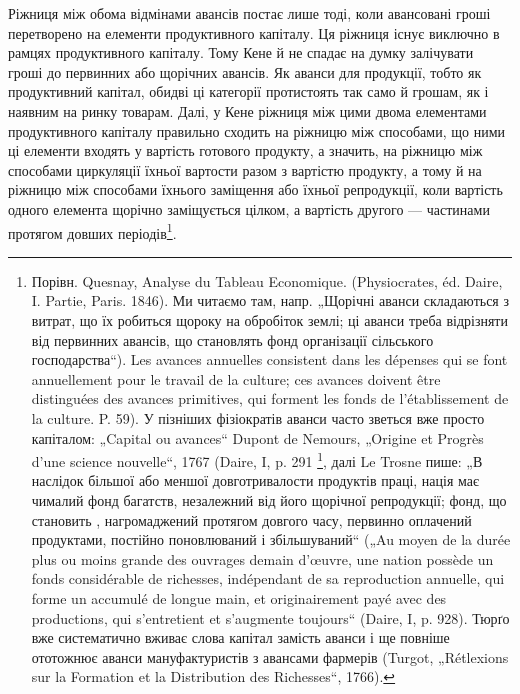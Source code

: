 Ріжниця між обома відмінами авансів постає лише тоді, коли авансовані
гроші перетворено на елементи продуктивного капіталу. Ця ріжниця
існує виключно в рамцях продуктивного капіталу. Тому Кене й не спадає
на думку залічувати гроші до первинних або щорічних авансів. Як аванси
для продукції, тобто як продуктивний капітал, обидві ці категорії протистоять
так само й грошам, як і наявним на ринку товарам. Далі, у Кене
ріжниця між цими двома елементами продуктивного капіталу правильно
сходить на ріжницю між способами, що ними ці елементи входять у вартість
готового продукту, а значить, на ріжницю між способами циркуляції
їхньої вартости разом з вартістю продукту, а тому й на ріжницю
між способами їхнього заміщення або їхньої репродукції, коли вартість
одного елемента щорічно заміщується цілком, а вартість другого — частинами
протягом довших періодів\footnote{
Порівн. Quesnay, Analyse du Tableau Economique. (Physiocrates, éd. Daire,
I. Partie, Paris. 1846). Ми читаємо там, напр. „Щорічні аванси складаються з витрат,
що їх робиться щороку на обробіток землі; ці аванси треба відрізняти від первинних
авансів, що становлять фонд організації сільського господарства“). Les
avances annuelles consistent dans les dépenses qui se font annuellement pour le
travail de la culture; ces avances doivent être distinguées des avances primitives,
qui forment les fonds de l’établissement de la culture. P. 59). У пізніших фізіократів
аванси часто зветься вже просто капіталом: „Capital ou avances“ Dupont de
Nemours, „Origine et Progrès d’une science nouvelle“, 1767 (Daire, I, p. 291 \footnote*{
Цитоване місце є не в статті „Origine et Progrès“, 1767 (Daire, I, p. 291),
a в статті „Maximes du docteur Quesnay“ (Daire, I, p. 391). \emph{Ред.}
},
далі Le Trosne пише: „В наслідок більшої або меншої довготривалости продуктів
праці, нація має чималий фонд багатств, незалежний від його щорічної
репродукції; фонд, що становить , нагромаджений протягом довгого
часу, первинно оплачений продуктами, постійно поновлюваний і збільшуваний“
(„Au moyen de la durée plus ou moins grande des ouvrages demain d'œuvre, une
nation possède un fonds considérable de richesses, indépendant de sa reproduction
annuelle, qui forme un  accumulé de longue main, et originairement payé
avec des productions, qui s'entretient et s’augmente toujours“ (Daire, I, p. 928).
Тюрґо вже систематично вживає слова капітал замість аванси і ще повніше ототожнює
аванси мануфактуристів з авансами фармерів (Turgot, „Rétlexions sur la
Formation et la Distribution des Richesses“, 1766).
}.

